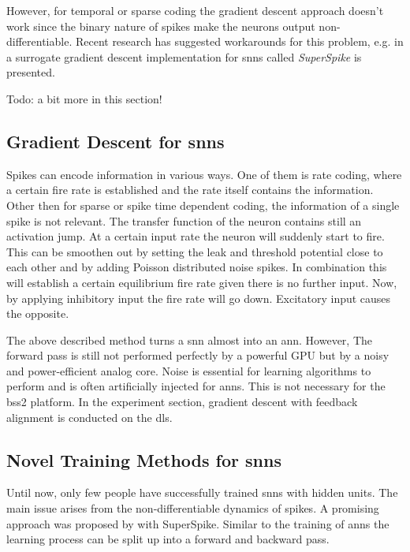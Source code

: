 However, for temporal or sparse coding the gradient descent approach doesn't work since the binary nature of spikes make the neurons output non-differentiable. Recent research has suggested workarounds for this problem, e.g. in \cite{zenke2018superspike} a surrogate gradient descent implementation for \glspl{snn} called \emph{SuperSpike} is presented.


Todo: a bit more in this section!



\subsection{Gradient Descent for \glspl{snn}}

Spikes can encode information in various ways. One of them is rate coding, where a certain fire rate is established and the rate itself contains the information. Other then for sparse or spike time dependent coding, the information of a single spike is not relevant. The transfer function of the neuron contains still an activation jump. At a certain input rate the neuron will suddenly start to fire. This can be smoothen out by setting the leak and threshold potential close to each other and by adding Poisson distributed noise spikes. In combination this will establish a certain equilibrium fire rate given there is no further input. Now, by applying inhibitory input the fire rate will go down. Excitatory input causes the opposite.

The above described method turns a \gls{snn} almost into an \gls{ann}. However, The forward pass is still not performed perfectly by a powerful GPU but by a noisy and power-efficient analog core. Noise is essential for learning algorithms to perform and is often artificially injected for \glspl{ann}. This is not necessary for the \gls{bss2} platform. In the experiment section, gradient descent with feedback alignment is conducted on the \gls{dls}.


\subsection{Novel Training Methods for \glspl{snn}}
\label{superspike}


Until now, only few people have successfully trained \glspl{snn} with hidden units. The main issue arises from the non-differentiable dynamics of spikes. A promising approach was proposed by \cite{zenke2018superspike} with SuperSpike. Similar to the training of \glspl{ann} the learning process can be split up into a forward and backward pass. 

